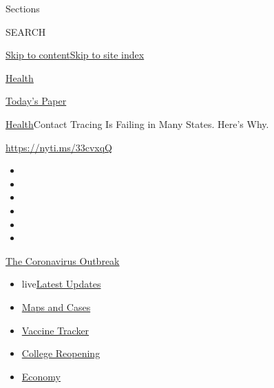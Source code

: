 Sections

SEARCH

\protect\hyperlink{site-content}{Skip to
content}\protect\hyperlink{site-index}{Skip to site index}

\href{https://www.nytimes.com/section/health}{Health}

\href{https://myaccount.nytimes.com/auth/login?response_type=cookie\&client_id=vi}{}

\href{https://www.nytimes.com/section/todayspaper}{Today's Paper}

\href{/section/health}{Health}\textbar{}Contact Tracing Is Failing in
Many States. Here's Why.

\url{https://nyti.ms/33cvxqQ}

\begin{itemize}
\item
\item
\item
\item
\item
\item
\end{itemize}

\href{https://www.nytimes.com/news-event/coronavirus?action=click\&pgtype=Article\&state=default\&region=TOP_BANNER\&context=storylines_menu}{The
Coronavirus Outbreak}

\begin{itemize}
\tightlist
\item
  live\href{https://www.nytimes.com/2020/08/03/world/coronavirus-covid-19.html?action=click\&pgtype=Article\&state=default\&region=TOP_BANNER\&context=storylines_menu}{Latest
  Updates}
\item
  \href{https://www.nytimes.com/interactive/2020/us/coronavirus-us-cases.html?action=click\&pgtype=Article\&state=default\&region=TOP_BANNER\&context=storylines_menu}{Maps
  and Cases}
\item
  \href{https://www.nytimes.com/interactive/2020/science/coronavirus-vaccine-tracker.html?action=click\&pgtype=Article\&state=default\&region=TOP_BANNER\&context=storylines_menu}{Vaccine
  Tracker}
\item
  \href{https://www.nytimes.com/2020/08/02/us/covid-college-reopening.html?action=click\&pgtype=Article\&state=default\&region=TOP_BANNER\&context=storylines_menu}{College
  Reopening}
\item
  \href{https://www.nytimes.com/live/2020/08/03/business/stock-market-today-coronavirus?action=click\&pgtype=Article\&state=default\&region=TOP_BANNER\&context=storylines_menu}{Economy}
\end{itemize}

